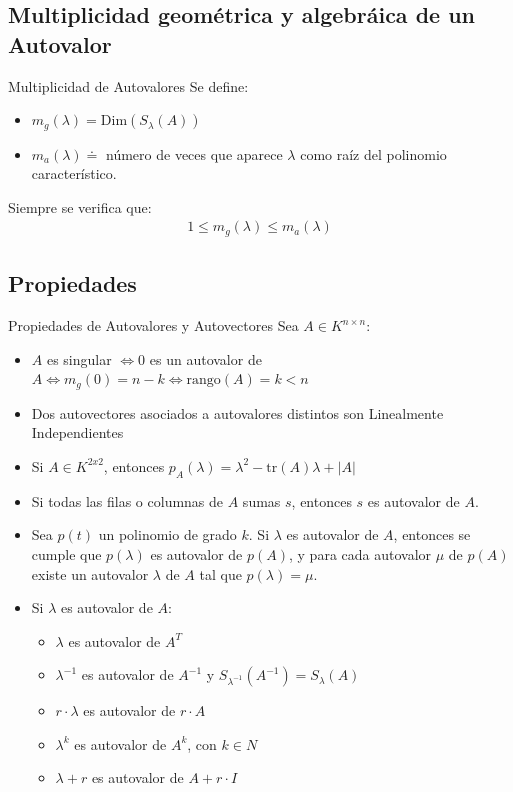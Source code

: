 \documentclass[a4paper, twoside]{article}
\numberwithin{equation}{section}
\numberwithin{figure}{section}
\numberwithin{table}{section}
\newcommand{\rg}[1]{\text{rango}\left(#1\right)}
\newcommand{\dime}[1]{\text{Dim}(#1)}
\newcommand{\dete}[1]{\left\vert #1 \right\vert}
\newcommand{\tr}[1]{\text{tr}(#1)}
\begin{document}
\subsection{Multiplicidad geométrica y algebráica de un Autovalor}
\begin{definicion*}{Multiplicidad de Autovalores}
	Se define:
	\begin{itemize}
		\item $m_g(\lambda)=\dime{S_\lambda(A)}$
		\item $m_a(\lambda) \doteq$ número de veces que aparece $\lambda$ como raíz del polinomio característico.
	\end{itemize}
	
	Siempre se verifica que:
	\begin{align}
		1 \leq m_g(\lambda) \leq m_a(\lambda)
	\end{align}
\end{definicion*}

\subsection{Propiedades}
\begin{definicion*}{Propiedades de Autovalores y Autovectores}
	Sea $A \in K^{n \times n}$:
	\begin{itemize}
		\item $A$ es singular $\Longleftrightarrow 0$ es un autovalor de $A \Longleftrightarrow m_g(0)=n-k \Longleftrightarrow \rg{A}=k<n$
		\item Dos autovectores asociados a autovalores distintos son Linealmente Independientes
		\item Si $A \in K^{2x2}$, entonces $p_A(\lambda)=\lambda^2-\tr{A}\lambda+\dete{A}$
		\item Si todas las filas o columnas de $A$ sumas $s$, entonces $s$ es autovalor de $A$.
		\item Sea $p(t)$ un polinomio de grado $k$. Si $\lambda$ es autovalor de $A$, entonces se cumple que $p(\lambda)$ es autovalor de $p(A)$, y para cada autovalor $\mu$ de $p(A)$ existe un autovalor $\lambda$ de $A$ tal que $p(\lambda)=\mu$.
		\item Si $\lambda$ es autovalor de $A$:
		\begin{itemize}
			\item $\lambda$ es autovalor de $A^T$
			\item $\lambda^{-1}$ es autovalor de $A^{-1}$ y $S_{\lambda^{-1}}\left(A^{-1}\right) = S_\lambda(A)$
			\item $r \cdot \lambda$ es autovalor de $r \cdot A$
			\item $\lambda^k$ es autovalor de $A^k$, con $k \in N$
			\item $\lambda+r$ es autovalor de $A+r \cdot I$
		\end{itemize}
	\end{itemize}
\end{definicion*}
\end{document}

